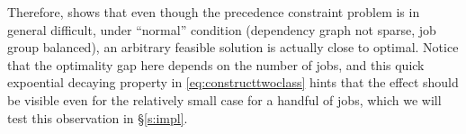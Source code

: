 Therefore, \cite{schulz2011near} shows that even though the precedence constraint problem is in general difficult, under ``normal'' condition (dependency graph not sparse, job group balanced), an arbitrary feasible solution is actually close to optimal. Notice that the optimality gap here depends on the number of jobs, and this quick expoential decaying property in \eqref{eq:constructtwoclass} hints that the effect should be visible even for the relatively small case for a handful of jobs, which we will test this observation in \S\ref{s:impl}. 